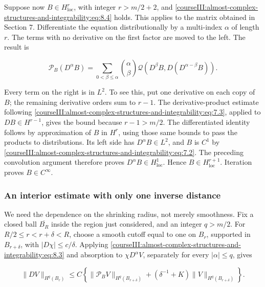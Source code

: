 Suppose now \(B\in H^r_{\mathrm{loc}}\), with integer \(r>m/2+2\), and \eqref{courseIII:almost-complex-structures-and-integrability:eq:8.4} holds. This applies to the matrix obtained in Section 7. Differentiate the equation distributionally by a multi-index \(\alpha\) of length \(r\). The terms with no derivative on the first factor are moved to the left. The result is

\begin{equation}
\mathcal P_B(D^\alpha B)
=\sum_{0<\beta\leq\alpha}\binom{\alpha}{\beta}
\mathcal Q(D^\beta B,D(D^{\alpha-\beta}B)).
\label{courseIII:almost-complex-structures-and-integrability:eq:8.7}
\end{equation}

Every term on the right is in \(L^2\). To see this, put one derivative on each copy of \(B\); the remaining derivative orders sum to \(r-1\). The derivative-product estimate following \eqref{courseIII:almost-complex-structures-and-integrability:eq:7.3}, applied to \(DB\in H^{r-1}\), gives the bound because \(r-1>m/2\). The differentiated identity follows by approximation of \(B\) in \(H^r\), using those same bounds to pass the products to distributions. Its left side has \(D^\alpha B\in L^2\), and \(B\) is \(C^1\) by \eqref{courseIII:almost-complex-structures-and-integrability:eq:7.2}. The preceding convolution argument therefore proves \(D^\alpha B\in H^1_{\mathrm{loc}}\). Hence \(B\in H^{r+1}_{\mathrm{loc}}\). Iteration proves \(B\in C^\infty\).

\subsubsection{An interior estimate with only one inverse distance}
\label{courseIII:almost-complex-structures-and-integrability:section-8.2}

We need the dependence on the shrinking radius, not merely smoothness. Fix a closed ball \(\overline{B_R}\) inside the region just considered, and an integer \(q>m/2\). For \(R/2\leq r<r+\delta<R\), choose a smooth cutoff equal to one on \(B_r\), supported in \(B_{r+\delta}\), with \(|D\chi|\leq c/\delta\). Applying \eqref{courseIII:almost-complex-structures-and-integrability:eq:8.3} and absorption to \(\chi D^\alpha V\), separately for every \(|\alpha|\leq q\), gives

\begin{equation}
\|DV\|_{H^q(B_r)}
\leq C\left\{
\|\mathcal P_BV\|_{H^q(B_{r+\delta})}
+(\delta^{-1}+K)\|V\|_{H^q(B_{r+\delta})}
\right\}.
\label{courseIII:almost-complex-structures-and-integrability:eq:8.8}
\end{equation}

